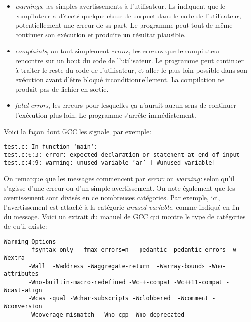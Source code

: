 \documentclass[a4paper,11pt,twoside,final]{article}
\begin{document}
  \begin{itemize}
    \item \textit{warnings}, les simples avertissements à l'utilisateur. Ils
      indiquent que le compilateur a détecté quelque chose de suspect dans le
      code de l'utilisateur, potentiellement une erreur de sa part. Le
      programme peut tout de même continuer son exécution et produire un
      résultat plausible.
    \item \textit{complaints}, ou tout simplement \textit{errors}, les erreurs
      que le compilateur rencontre sur un bout du code de l'utilisateur. Le
      programme peut continuer à traiter le reste du code de l'utilisateur,
      et aller le plus loin possible dans son exécution avant d'être bloqué
      inconditionnellement. La compilation ne produit pas de fichier en sortie.
    \item \textit{fatal errors}, les erreurs pour lesquelles ça n'aurait aucun
      sens de continuer l'exécution plus loin. Le programme s'arrête
      immédiatement.
  \end{itemize}

  \vspace{0.5cm}

  Voici la façon dont GCC les signale, par exemple:

  \begin{verbatim}
test.c: In function ‘main’:
test.c:6:3: error: expected declaration or statement at end of input
test.c:4:9: warning: unused variable ‘ar’ [-Wunused-variable]
  \end{verbatim}

  On remarque que les messages commencent par \textit{error:} ou
  \textit{warning:} selon
  qu'il s'agisse d'une erreur ou d'un simple avertissement. On note également
  que les avertissement sont divisés en de nombreuses catégories. Par exemple,
  ici, l'avertissement est attaché à la catégorie \textit{unused-variable},
  comme indiqué en fin du message.
  Voici un extrait du manuel de GCC qui montre le type de catégories de qu'il
  existe:

  \begin{verbatim}
Warning Options
       -fsyntax-only  -fmax-errors=n  -pedantic -pedantic-errors -w -Wextra
       -Wall  -Waddress -Waggregate-return  -Warray-bounds -Wno-attributes
       -Wno-builtin-macro-redefined -Wc++-compat -Wc++11-compat -Wcast-align
       -Wcast-qual -Wchar-subscripts -Wclobbered  -Wcomment -Wconversion
       -Wcoverage-mismatch  -Wno-cpp -Wno-deprecated
  \end{verbatim}
\end{document}
